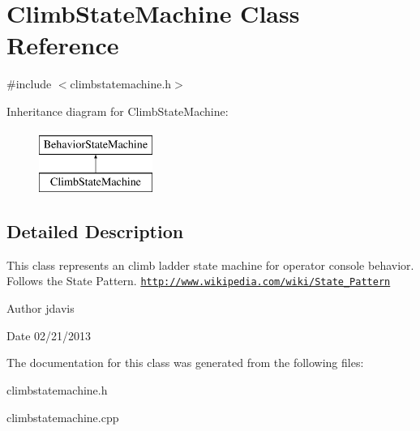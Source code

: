 \hypertarget{classClimbStateMachine}{\section{Climb\-State\-Machine Class Reference}
\label{classClimbStateMachine}
}


{\ttfamily \#include $<$climbstatemachine.\-h$>$}

Inheritance diagram for Climb\-State\-Machine\-:\begin{figure}[H]
\begin{center}
\leavevmode
\includegraphics[height=2.000000cm]{classClimbStateMachine}
\end{center}
\end{figure}


\subsection{Detailed Description}
This class represents an climb ladder state machine for operator console behavior. Follows the State Pattern. \href{http://www.wikipedia.com/wiki/State_Pattern}{\tt http\-://www.\-wikipedia.\-com/wiki/\-State\-\_\-\-Pattern}

\begin{DoxyAuthor}{Author}
jdavis 
\end{DoxyAuthor}
\begin{DoxyDate}{Date}
02/21/2013 
\end{DoxyDate}


The documentation for this class was generated from the following files\-:\begin{DoxyCompactItemize}
\item 
climbstatemachine.\-h\item 
climbstatemachine.\-cpp\end{DoxyCompactItemize}

